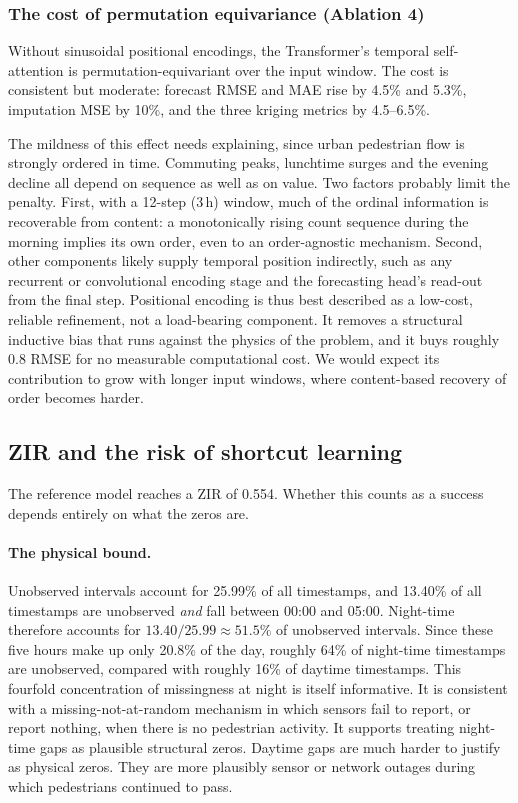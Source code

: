 \subsubsection{The cost of permutation equivariance (Ablation 4)}
\label{sec:exp3-abl-pe}

Without sinusoidal positional encodings, the Transformer's temporal
self-attention is permutation-equivariant over the input window. The
cost is consistent but moderate: forecast RMSE and MAE rise by 4.5\% and
5.3\%, imputation MSE by 10\%, and the three kriging metrics by 4.5--6.5\%.

The mildness of this effect needs explaining, since urban pedestrian
flow is strongly ordered in time. Commuting peaks, lunchtime surges and
the evening decline all depend on sequence as well as on value. Two
factors probably limit the penalty. First, with a 12-step (3\,h) window,
much of the ordinal information is recoverable from content: a
monotonically rising count sequence during the morning implies its own
order, even to an order-agnostic mechanism. Second, other components
likely supply temporal position indirectly, such as any recurrent or
convolutional encoding stage and the forecasting head's read-out from
the final step.
Positional encoding is thus best described as a low-cost, reliable
refinement, not a load-bearing component. It removes a structural
inductive bias that runs against the physics of the problem, and it
buys roughly 0.8 RMSE for no measurable computational cost. We would
expect its contribution to grow with longer input windows, where
content-based recovery of order becomes harder.

\subsection{ZIR and the risk of shortcut learning}
\label{sec:exp3-zero-recall}

The reference model reaches a ZIR of 0.554. Whether this counts
as a success depends entirely on what the zeros are.

\paragraph{The physical bound.}
Unobserved intervals account for 25.99\% of all timestamps, and 13.40\%
of all timestamps are unobserved \emph{and} fall between 00:00 and 05:00.
Night-time therefore accounts for $13.40 / 25.99 \approx 51.5\%$ of
unobserved intervals. Since these five hours make up only 20.8\% of the
day, roughly 64\% of night-time timestamps are unobserved, compared with
roughly 16\% of daytime timestamps. This fourfold concentration of
missingness at night is itself informative. It is consistent with a
missing-not-at-random mechanism in which sensors fail to report, or
report nothing, when there is no pedestrian activity. It supports
treating night-time gaps as plausible structural zeros. Daytime gaps are
much harder to justify as physical zeros. They are more plausibly sensor
or network outages during which pedestrians continued to pass.

